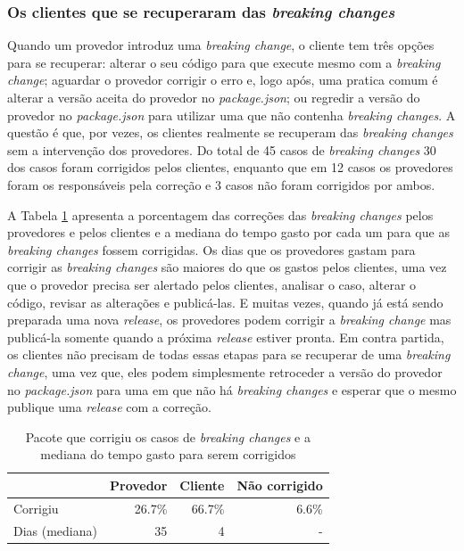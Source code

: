 \subsubsection{Os clientes que se recuperaram das \textit{breaking changes}}

Quando um provedor introduz uma \textit{breaking change}, o cliente tem três opções para se recuperar: alterar o seu código para que execute mesmo com a \textit{breaking change}; aguardar o provedor corrigir o erro e, logo após, uma pratica comum é alterar a versão aceita do provedor no \textit{package.json}; ou regredir a versão do provedor no \textit{package.json} para utilizar uma que não contenha \textit{breaking changes}. A questão é que, por vezes, os clientes realmente se recuperam das \textit{breaking changes} sem a intervenção dos provedores. Do total de 45 casos de \textit{breaking changes} 30 dos casos foram corrigidos pelos clientes, enquanto que em 12 casos os provedores foram os responsáveis pela correção  e 3 casos não foram corrigidos por ambos.

A Tabela \ref{tab:fix} apresenta a porcentagem das correções das \textit{breaking changes} pelos provedores e pelos clientes e a mediana do tempo gasto por cada um para que as \textit{breaking changes} fossem corrigidas. Os dias que os provedores gastam para corrigir as \textit{breaking changes} são maiores do que os gastos pelos clientes, uma vez que o provedor precisa ser alertado pelos clientes, analisar o caso, alterar o código, revisar as alterações e publicá-las. E muitas vezes, quando já está sendo preparada uma nova \textit{release}, os provedores podem corrigir a \textit{breaking change} mas publicá-la somente quando a próxima \textit{release} estiver pronta. Em contra partida, os clientes não precisam de todas essas etapas para se recuperar de uma \textit{breaking change}, uma vez que, eles podem simplesmente retroceder a versão do provedor no \textit{package.json} para uma em que não há \textit{breaking changes} e esperar que o mesmo publique uma \textit{release} com a correção.

\begin{table}[!h]
	\centering
	\begin{tabular}{lrrr}
		\toprule
		\centering
		& Provedor    & Cliente     & Não corrigido                             \\ \midrule
		Corrigiu           & 26.7\% & 66.7\% & 6.6\%    \\ \hline
		Dias (mediana)     & 35          & 4           & -            \\ \bottomrule
	\end{tabular}
	\caption{Pacote que corrigiu os casos de \textit{breaking changes} e a mediana do tempo gasto para serem corrigidos}
	\label{tab:fix}
\end{table}

